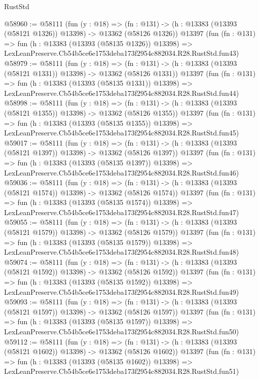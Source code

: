 \begin{lexlean}{RustStd}
\begin{coremodule}
@58960 := @58111
    (fun (y : @18) =>
    (fn : @131) -> (h : @13383 (@13393 (@58121 @1326)) @13398) -> @13362 (@58126 @1326))
    @13397
    (fun (fn : @131) =>
    fun (h : @13383 (@13393 (@58135 @1326)) @13398) =>
    LexLeanPreserve.Cb54b5ce6e1753deba173f2954c882034.R28.RustStd.fun43)
@58979 := @58111
    (fun (y : @18) =>
    (fn : @131) -> (h : @13383 (@13393 (@58121 @1331)) @13398) -> @13362 (@58126 @1331))
    @13397
    (fun (fn : @131) =>
    fun (h : @13383 (@13393 (@58135 @1331)) @13398) =>
    LexLeanPreserve.Cb54b5ce6e1753deba173f2954c882034.R28.RustStd.fun44)
@58998 := @58111
    (fun (y : @18) =>
    (fn : @131) -> (h : @13383 (@13393 (@58121 @1355)) @13398) -> @13362 (@58126 @1355))
    @13397
    (fun (fn : @131) =>
    fun (h : @13383 (@13393 (@58135 @1355)) @13398) =>
    LexLeanPreserve.Cb54b5ce6e1753deba173f2954c882034.R28.RustStd.fun45)
@59017 := @58111
    (fun (y : @18) =>
    (fn : @131) -> (h : @13383 (@13393 (@58121 @1397)) @13398) -> @13362 (@58126 @1397))
    @13397
    (fun (fn : @131) =>
    fun (h : @13383 (@13393 (@58135 @1397)) @13398) =>
    LexLeanPreserve.Cb54b5ce6e1753deba173f2954c882034.R28.RustStd.fun46)
@59036 := @58111
    (fun (y : @18) =>
    (fn : @131) -> (h : @13383 (@13393 (@58121 @1574)) @13398) -> @13362 (@58126 @1574))
    @13397
    (fun (fn : @131) =>
    fun (h : @13383 (@13393 (@58135 @1574)) @13398) =>
    LexLeanPreserve.Cb54b5ce6e1753deba173f2954c882034.R28.RustStd.fun47)
@59055 := @58111
    (fun (y : @18) =>
    (fn : @131) -> (h : @13383 (@13393 (@58121 @1579)) @13398) -> @13362 (@58126 @1579))
    @13397
    (fun (fn : @131) =>
    fun (h : @13383 (@13393 (@58135 @1579)) @13398) =>
    LexLeanPreserve.Cb54b5ce6e1753deba173f2954c882034.R28.RustStd.fun48)
@59074 := @58111
    (fun (y : @18) =>
    (fn : @131) -> (h : @13383 (@13393 (@58121 @1592)) @13398) -> @13362 (@58126 @1592))
    @13397
    (fun (fn : @131) =>
    fun (h : @13383 (@13393 (@58135 @1592)) @13398) =>
    LexLeanPreserve.Cb54b5ce6e1753deba173f2954c882034.R28.RustStd.fun49)
@59093 := @58111
    (fun (y : @18) =>
    (fn : @131) -> (h : @13383 (@13393 (@58121 @1597)) @13398) -> @13362 (@58126 @1597))
    @13397
    (fun (fn : @131) =>
    fun (h : @13383 (@13393 (@58135 @1597)) @13398) =>
    LexLeanPreserve.Cb54b5ce6e1753deba173f2954c882034.R28.RustStd.fun50)
@59112 := @58111
    (fun (y : @18) =>
    (fn : @131) -> (h : @13383 (@13393 (@58121 @1602)) @13398) -> @13362 (@58126 @1602))
    @13397
    (fun (fn : @131) =>
    fun (h : @13383 (@13393 (@58135 @1602)) @13398) =>
    LexLeanPreserve.Cb54b5ce6e1753deba173f2954c882034.R28.RustStd.fun51)

\end{coremodule}
\end{lexlean}

